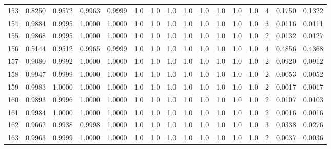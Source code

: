 \begin{tabular}{lrrrrrrrrrrrrrrr}
153 &      0.8250 &  0.9572 &  0.9963 &  0.9999 &     1.0 &     1.0 &     1.0 &     1.0 &     1.0 &     1.0 &      1.0 &        1.0 &      4 &                    0.1750 &                     0.1322 \\
154 &      0.9884 &  0.9995 &  1.0000 &  1.0000 &     1.0 &     1.0 &     1.0 &     1.0 &     1.0 &     1.0 &      1.0 &        1.0 &      3 &                    0.0116 &                     0.0111 \\
155 &      0.9868 &  0.9995 &  1.0000 &  1.0000 &     1.0 &     1.0 &     1.0 &     1.0 &     1.0 &     1.0 &      1.0 &        1.0 &      2 &                    0.0132 &                     0.0127 \\
156 &      0.5144 &  0.9512 &  0.9965 &  0.9999 &     1.0 &     1.0 &     1.0 &     1.0 &     1.0 &     1.0 &      1.0 &        1.0 &      4 &                    0.4856 &                     0.4368 \\
157 &      0.9080 &  0.9992 &  1.0000 &  1.0000 &     1.0 &     1.0 &     1.0 &     1.0 &     1.0 &     1.0 &      1.0 &        1.0 &      2 &                    0.0920 &                     0.0912 \\
158 &      0.9947 &  0.9999 &  1.0000 &  1.0000 &     1.0 &     1.0 &     1.0 &     1.0 &     1.0 &     1.0 &      1.0 &        1.0 &      2 &                    0.0053 &                     0.0052 \\
159 &      0.9983 &  1.0000 &  1.0000 &  1.0000 &     1.0 &     1.0 &     1.0 &     1.0 &     1.0 &     1.0 &      1.0 &        1.0 &      2 &                    0.0017 &                     0.0017 \\
160 &      0.9893 &  0.9996 &  1.0000 &  1.0000 &     1.0 &     1.0 &     1.0 &     1.0 &     1.0 &     1.0 &      1.0 &        1.0 &      2 &                    0.0107 &                     0.0103 \\
161 &      0.9984 &  1.0000 &  1.0000 &  1.0000 &     1.0 &     1.0 &     1.0 &     1.0 &     1.0 &     1.0 &      1.0 &        1.0 &      2 &                    0.0016 &                     0.0016 \\
162 &      0.9662 &  0.9938 &  0.9998 &  1.0000 &     1.0 &     1.0 &     1.0 &     1.0 &     1.0 &     1.0 &      1.0 &        1.0 &      3 &                    0.0338 &                     0.0276 \\
163 &      0.9963 &  0.9999 &  1.0000 &  1.0000 &     1.0 &     1.0 &     1.0 &     1.0 &     1.0 &     1.0 &      1.0 &        1.0 &      2 &                    0.0037 &                     0.0036 \\

\end{tabular}
